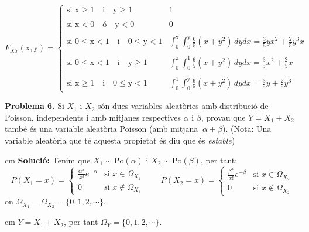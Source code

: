 \documentclass{article}
\begin{document}
\[
F_{XY}(\mathrm{x}, \mathrm{y})=\begin{cases}
\text{si } \mathrm{x} \geq 1 \quad \text{i} \quad \mathrm{y} \geq 1 & 1 \\ \\
\text{si } \mathrm{x} < 0 \quad \text{\'o} \quad \mathrm{y} < 0 & 0 \\ \\
\text{si } 0 \leq \mathrm{x} < 1 \quad \text{i} \quad 0 \leq \mathrm{y} < 1 &
\int_0^\mathrm{x} \int_0^\mathrm{y} \frac{6}{5}(x+y^2) \, dy dx =\frac{3}{5}yx^2+\frac{2}{5}y^3x\\ \\
\text{si } 0 \leq \mathrm{x} < 1 \quad \text{i} \quad \mathrm{y} \geq 1 & 
\int_0^\mathrm{x} \int_0^1 \frac{6}{5}(x+y^2) \, dy dx = \frac{3}{5}x^2+\frac{2}{5} x \\ \\
\text{si } \mathrm{x} \geq 1 \quad \text{i} \quad 0 \leq \mathrm{y} < 1 & 
\int_0^\mathrm{1} \int_0^\mathrm{y} \frac{6}{5}(x+y^2) \, dy dx = \frac{3}{5}y+\frac{2}{5} y^3 
\end{cases}
\]



\newpage
\noindent
\textbf{Problema 6.} Si $X_1 \mbox{ i } X_2 $ s\'on dues variables aleat\`ories amb
distribuci\'o de Poisson, independents i amb mitjanes respectives
$\alpha \mbox{ i } \beta$, provau que $Y = X_1 + X_2 $ tamb\'e \'es
una variable aleat\`oria Poisson (amb mitjana $\> \alpha + \beta$).
(Nota: Una variable aleat\`oria que t\'e aquesta propietat \'es diu que
\'es \emph{estable})

 cm
\noindent
\textbf{Soluci\'o:} Tenim que $X_1 \sim \mathrm{Po}(\alpha)$ i 
$X_2 \sim \mathrm{Po}(\beta)$, per tant:
\[
P(X_1=x)=\begin{cases}
\frac{\alpha^{x}}{x!} e^{-\alpha} & \text{si } x \in \Omega_{X_1}\\
0 & \text{si } x \notin \Omega_{X_1} \end{cases}
\qquad 
P(X_2=x)=\begin{cases}
\frac{\beta^{x}}{x!} e^{-\beta} & \text{si } x \in \Omega_{X_2}\\
0 & \text{si } x \notin \Omega_{X_2} \end{cases}
\]
\noindent
on $\Omega_{X_1}=\Omega_{X_2}=\{ 0, 1, 2, \cdots \}$.

 cm
\noindent
$Y=X_1+X_2$, per tant $\Omega_Y=\{0, 1, 2, \cdots\}$. 
\end{document}
